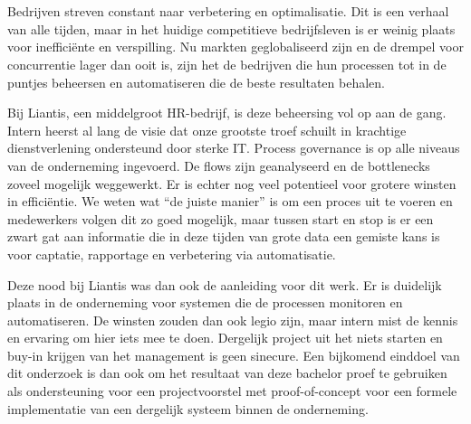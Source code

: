 
\chapter{}%
\label{ch:inleiding}
\section{}%
\label{sec:probleemstelling}

Bedrijven streven constant naar verbetering en optimalisatie. Dit is een verhaal van alle tijden, maar in het huidige competitieve bedrijfsleven is er weinig plaats voor inefficiënte en verspilling. Nu markten geglobaliseerd zijn en de drempel voor concurrentie lager dan ooit is, zijn het de bedrijven die hun processen tot in de puntjes beheersen en automatiseren die de beste resultaten behalen.\newline

Bij Liantis, een middelgroot HR-bedrijf, is deze beheersing vol op aan de gang. Intern heerst al lang de visie dat onze grootste troef schuilt in krachtige dienstverlening ondersteund door sterke IT. Process governance is op alle niveaus van de onderneming ingevoerd. De flows zijn geanalyseerd en de bottlenecks zoveel mogelijk weggewerkt. Er is echter nog veel potentieel voor grotere winsten in efficiëntie. We weten wat “de juiste manier” is om een proces uit te voeren en medewerkers volgen dit zo goed mogelijk, maar tussen start en stop is er een zwart gat aan informatie die in deze tijden van grote data een gemiste kans is voor captatie, rapportage en verbetering via automatisatie.\newline 

Deze nood bij Liantis was dan ook de aanleiding voor dit werk. Er is duidelijk plaats in de onderneming voor systemen die de processen monitoren en automatiseren. De winsten zouden dan ook legio zijn, maar intern mist de kennis en ervaring om hier iets mee te doen. Dergelijk project uit het niets starten en buy-in krijgen van het management is geen sinecure. Een bijkomend einddoel van dit onderzoek is dan ook om het resultaat van deze bachelor proef te gebruiken als ondersteuning voor een projectvoorstel met proof-of-concept voor een formele implementatie van een dergelijk systeem binnen de onderneming.
